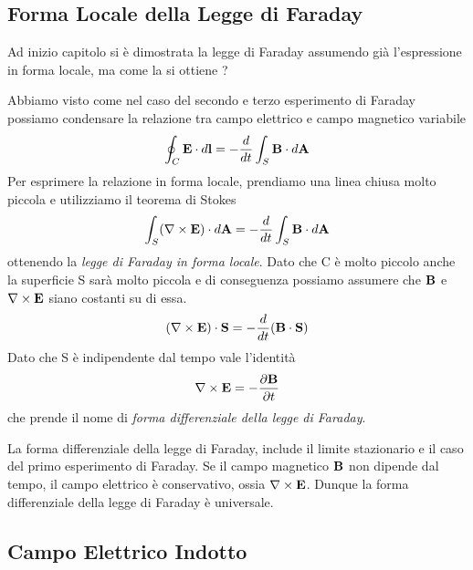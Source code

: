 \subsection{Forma Locale della Legge di Faraday}
Ad inizio capitolo si \`e dimostrata la legge di Faraday assumendo gi\`a l'espressione in forma locale, ma come la si ottiene ?

Abbiamo visto come nel caso del secondo e terzo esperimento di Faraday possiamo condensare la relazione tra campo elettrico e campo magnetico variabile 
\begin{equation*}
	\oint_{C} \bold{E} \cdot d\bold{l} = - \frac{d}{dt} \int_{S} \bold{B} \cdot d\bold{A}
\end{equation*}
\newpage 
Per esprimere la relazione in forma locale, prendiamo una linea chiusa molto piccola e utilizziamo il teorema di Stokes 
\begin{equation*}
	\int_{S} (\nabla \times \bold{E}) \cdot d\bold{A} = - \frac{d}{dt} \int_{S} \bold{B} \cdot d\bold{A}
\end{equation*}
ottenendo la \textit{legge di Faraday in forma locale}. Dato che C \`e molto piccolo anche la superficie S sar\`a molto piccola e di conseguenza possiamo assumere che $\bold{B}$ e $\nabla \times \bold{E}$ siano costanti su di essa.
\begin{equation*}
	(\nabla \times \bold{E}) \cdot \bold{S} = - \frac{d}{dt}(\bold{B} \cdot \bold{S})
\end{equation*}
Dato che S \`e indipendente dal tempo vale l'identit\`a 
\begin{equation*}
	\nabla \times \bold{E} = - \frac{\partial \bold{B}}{\partial t}
\end{equation*}
che prende il nome di \textit{forma differenziale della legge di Faraday}.

La forma differenziale della legge di Faraday, include il limite stazionario e il caso del primo esperimento di Faraday. Se il campo magnetico $\bold{B}$ non dipende dal tempo, il campo elettrico \`e conservativo, ossia $\nabla \times \bold{E}$. Dunque la forma differenziale della legge di Faraday \`e universale.

\subsection{Campo Elettrico Indotto}

